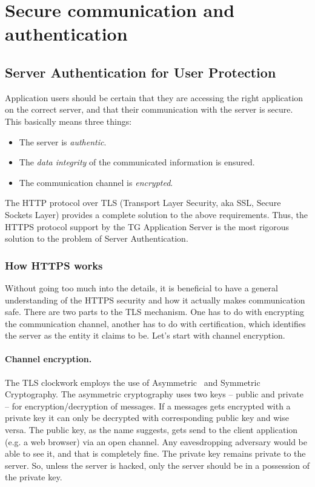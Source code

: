 \documentclass[a4paper,12pt,oneside,openright]{memoir}
\begin{document}
\section*{Secure communication and authentication}\label{sec:02}

\subsection*{Server Authentication for User Protection}

	Application users should be certain that they are accessing the right application on the correct server, and that their communication with the server is secure.
	This basically means three things:

	\begin{itemize}
	\item The server is \emph{authentic}.
	\item The \emph{data integrity} of the communicated information is ensured.
	\item The communication channel is \emph{encrypted}.
	\end{itemize}

	The HTTP protocol over TLS (Transport Layer Security, aka SSL, Secure Sockets Layer) provides a complete solution to the above requirements.
	Thus, the HTTPS protocol support by the TG Application 	Server is the most rigorous solution to the problem of Server Authentication.

\subsubsection*{How HTTPS works}
	Without going too much into the details, it is beneficial to have a general understanding of the HTTPS security and how it actually makes communication safe.
	There are two parts to the TLS mechanism.
	One has to do with encrypting the communication channel, another has to do with certification, which identifies the server as the entity it claims to be. Let's start with channel encryption.

	\paragraph{Channel encryption.}
	The TLS clockwork employs the use of Asymmetric~\cite{PKC} and Symmetric~\cite{SKC} Cryptography.
	The asymmetric cryptography uses two keys -- public and private -- for encryption/decryption of messages.
	If a messages gets encrypted with a private key it can only be decrypted with corresponding public key and wise versa.
	The public key, as the name suggests, gets send to the client application (e.g. a web browser) via an open channel.
	Any eavesdropping adversary would be able to see it, and that is completely fine. The private key remains private to the server.
	So, unless the server is hacked, only the server should be in a possession of the private key.
\end{document}
